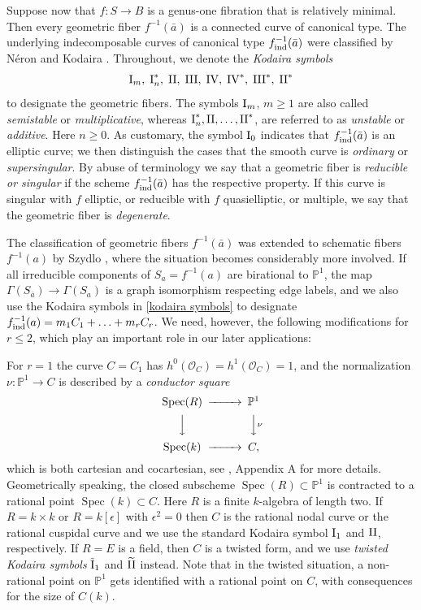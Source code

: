 \documentclass[oneside, 12pt]{amsart}
\theoremstyle{definition}
\theoremstyle{remark}
\newcommand{\PP}{\mathbb{P}}
\newcommand{\I}{\text{\rm I}}
\newcommand{\II}{\text{\rm II}}
\newcommand{\III}{\text{\rm III}}
\newcommand{\IV}{\text{\rm IV}}
\newcommand{\tI}{\text{\rm \~{I}}}
\renewcommand{\O}{\mathscr{O}}
\newcommand{\ra}{\rightarrow}
\newcommand{\Spec}{\operatorname{Spec}}
\newcommand{\ind}{\text{\rm ind}}
\newcommand{\ba}{{\bar{a}}}
\newcommand{\inv}{{-1}}
\begin{document}
Suppose now that $f:S\ra B$ is a genus-one fibration that is relatively minimal.
Then every geometric fiber $ f^{-1}(\ba)$ is a connected curve of canonical type.
The underlying indecomposable curves of canonical type $f^\inv_\ind(\ba)$ were classified by N\'eron \cite{Neron 1964} and Kodaira \cite{Kodaira 1963}.
Throughout, we denote the \emph{Kodaira symbols} 
\begin{equation}
\label{kodaira symbols}
\I_m,\;\I_n^*,\;\II,\;\III,\;\IV,\;\IV^*,\;\III^*,\; \II^*
\end{equation}
to designate the geometric fibers.  The symbols $\I_m$, $m\geq 1$ are also called \emph{semistable} or \emph{multiplicative},
whereas $\I_n^*,\II, \ldots,\II^*$,  are referred to as \emph{unstable} or \emph{additive}. Here $n\geq 0$.
As customary, the symbol $\I_0$ indicates that $f^\inv_\ind(\ba)$ is an elliptic curve; we then distinguish the cases
that the  smooth curve is \emph{ordinary} or \emph{supersingular}.
By abuse of terminology 
we say that a geometric fiber is \emph{reducible or singular} if the scheme $f^\inv_\ind(\ba)$ has the respective property.
If this curve is  singular with  $f$  elliptic, or reducible with $f$ quasielliptic, or multiple, 
 we say that the geometric fiber is \emph{degenerate}.

The   classification of geometric fibers $f^\inv(\ba)$ was extended to schematic fibers $ f^{-1}(a)$ by Szydlo \cite{Szydlo 2004},
where the situation becomes considerably more involved.
If all irreducible components   of $S_a=f^\inv(a)$ 
are birational to $\PP^1$, the map $\Gamma(S_\ba)\ra\Gamma(S_a)$ is a graph isomorphism respecting edge labels,
and we also use the Kodaira symbols in \eqref{kodaira symbols} to designate   $f^{-1}_\ind(a)=m_1C_1+\ldots+m_rC_r$.
We need, however, the following modifications for $r\leq 2$, which play an important role in our later applications:

For $r=1$ the curve  $C=C_1$ has $h^0(\O_C)=h^1(\O_C)=1$, and the normalization $\nu:\PP^1\ra C$ is described by 
a  \emph{conductor square}
$$
\begin{CD}
\Spec(R)	@>>>	\PP^1\\
@VVV		@VV\nu V\\
\Spec(k)	@>>>	C,
\end{CD}
$$
which is both cartesian and cocartesian, see \cite{Fanelli; Schroeer 2020}, Appendix A for more details. 
Geometrically speaking, the closed subscheme $\Spec(R)\subset\PP^1$
is contracted to a rational point $\Spec(k)\subset C$.
Here $R$ is a finite $k$-algebra of length two. If $R=k\times k$ or $R=k[\epsilon]$ with $\epsilon^2=0$ 
then $C$ is the rational nodal curve or the rational cuspidal curve and we use the standard Kodaira symbol $\I_1$ and $\II$,
respectively. If  $R=E$ is a field, then $C$ is a  twisted form, 
and we use   \emph{twisted Kodaira symbols} $\tI_1$ and $\widetilde{\II}$ instead.
Note that in the twisted situation, a non-rational point on $\PP^1$ gets identified
with a rational point on $C$, with consequences for the size of $C(k)$.
\end{document}

